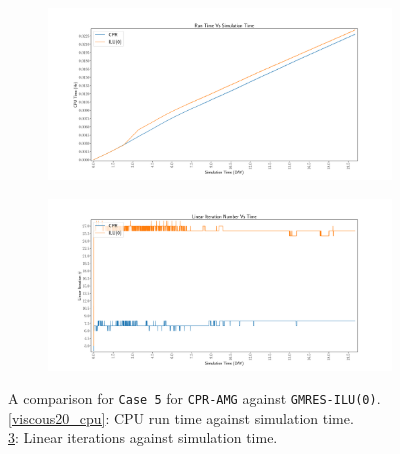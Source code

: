 \begin{figure}
\centering
\begin{subfigure}[b]{\textwidth}
   \includegraphics[width=1\linewidth]{figures/viscous/20x20/cpu_time.pdf}
   \caption{}
   \label{viscouse20_cpu}
\end{subfigure}

\begin{subfigure}[b]{\textwidth}
   \includegraphics[width=1\linewidth]{figures/viscous/20x20/its_time.pdf}
   \label{viscous20_its}
\end{subfigure}

\caption[caption]{A comparison for \texttt{Case 5} for \texttt{CPR-AMG} against \texttt{GMRES-ILU(0)}.\\\hspace{\textwidth}
	\cref{viscous20_cpu}: CPU run time against simulation time. \\\hspace{\textwidth}
	\cref{viscous20_its}: Linear iterations against simulation time.\\\hspace{\textwidth}}
\end{figure}

